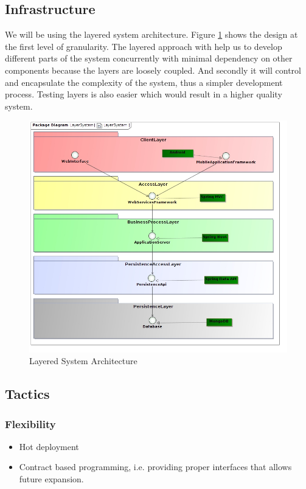 \documentclass[hidelinks,english]{article}
\begin{document}
		\subsection{Infrastructure}
			We will be using the layered system architecture. Figure \ref{LayeredAchitecture} shows the design at the first level of granularity. The layered approach with help us to develop different parts of the system concurrently with minimal dependency on other components because the layers are loosely coupled. And secondly it will control and encapsulate the complexity of the system, thus a simpler development process. Testing layers is also easier which would result in a higher quality system.
			\begin{figure}[!h]
				\includegraphics[width=\linewidth]{LayerSystem.jpg}
				\caption{Layered System Architecture}
				\label{LayeredAchitecture}
			\end{figure}
		
		\subsection{Tactics}
			\subsubsection{Flexibility}
				\begin{itemize}
					\item Hot deployment
					\item Contract based programming, i.e. providing proper interfaces that allows future expansion.
				\end{itemize}
			
\end{document}

